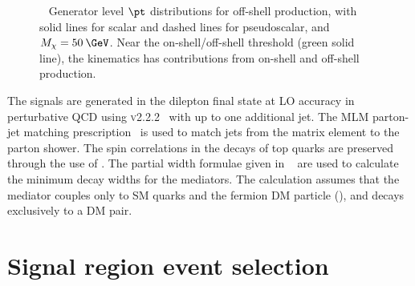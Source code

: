 \begin{figure}[htbp!]
\begin{center}
  \caption{~\protect{} Generator level $\pt$ distributions for off-shell production, with solid lines for scalar and dashed lines for pseudoscalar, and $M_\chi=50\:\GeV$.\protect{} Near the on-shell/off-shell threshold (green solid line), the kinematics has contributions from on-shell and off-shell production.}
  \label{fig:dmf_medpt2}
\end{center}
\end{figure}

The \ttDM signals are generated in the dilepton final state at LO accuracy in perturbative QCD using \AMCATNLO \textsc{v2.2.2}~\cite{Alwall:2014hca} with up to one additional jet. The MLM parton-jet matching prescription~\cite{Mangano:2006rw} is used to match jets from the matrix element to the parton shower. The spin correlations in the decays of top quarks are preserved through the use of \MadSpin. The partial width formulae given in ~\cite{PhysRevD.91.055009} are used to calculate the minimum decay widths for the mediators. The calculation assumes that the mediator couples only to SM quarks and the fermion DM particle (\chi), and decays exclusively to a DM pair.  

\section{Signal region event selection}
\label{sec:selection}

